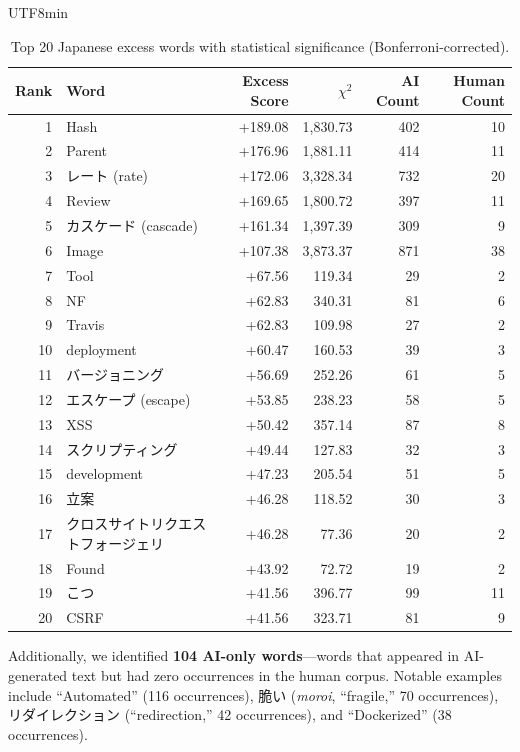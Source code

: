 \documentclass[11pt,a4paper]{article}
\begin{document}
\begin{CJK}{UTF8}{min}
\begin{table}[H]
\centering
\caption{Top 20 Japanese excess words with statistical significance (Bonferroni-corrected).}
\label{tab:top20}
\small
\begin{tabular}{rlrrrr}
\toprule
Rank & Word & Excess Score & $\chi^2$ & AI Count & Human Count \\
\midrule
1  & Hash              & +189.08 & 1,830.73 & 402 & 10 \\
2  & Parent            & +176.96 & 1,881.11 & 414 & 11 \\
3  & レート (rate)      & +172.06 & 3,328.34 & 732 & 20 \\
4  & Review            & +169.65 & 1,800.72 & 397 & 11 \\
5  & カスケード (cascade) & +161.34 & 1,397.39 & 309 & 9 \\
6  & Image             & +107.38 & 3,873.37 & 871 & 38 \\
7  & Tool              & +67.56  & 119.34   & 29  & 2 \\
8  & NF                & +62.83  & 340.31   & 81  & 6 \\
9  & Travis            & +62.83  & 109.98   & 27  & 2 \\
10 & deployment        & +60.47  & 160.53   & 39  & 3 \\
11 & バージョニング & +56.69 & 252.26 & 61 & 5 \\
12 & エスケープ (escape) & +53.85 & 238.23 & 58 & 5 \\
13 & XSS               & +50.42  & 357.14   & 87  & 8 \\
14 & スクリプティング & +49.44 & 127.83 & 32 & 3 \\
15 & development       & +47.23  & 205.54   & 51  & 5 \\
16 & 立案  & +46.28  & 118.52   & 30  & 3 \\
17 & クロスサイトリクエストフォージェリ & +46.28 & 77.36 & 20 & 2 \\
18 & Found             & +43.92  & 72.72    & 19  & 2 \\
19 & こつ  & +41.56  & 396.77   & 99  & 11 \\
20 & CSRF              & +41.56  & 323.71   & 81  & 9 \\
\bottomrule
\end{tabular}
\end{table}

Additionally, we identified \textbf{104 AI-only words}---words that appeared in AI-generated text but had zero occurrences in the human corpus. Notable examples include ``Automated'' (116 occurrences), 脆い (\textit{moroi}, ``fragile,'' 70 occurrences), リダイレクション (``redirection,'' 42 occurrences), and ``Dockerized'' (38 occurrences).


\end{CJK}
\end{document}
